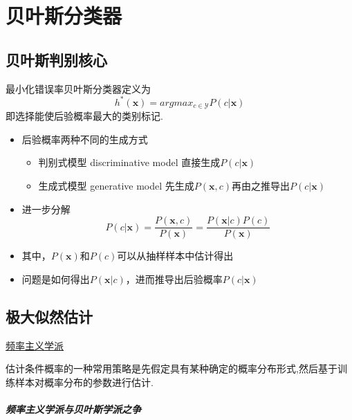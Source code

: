 \chapter{贝叶斯分类器}


\section{贝叶斯判别核心}

最小化错误率贝叶斯分类器定义为
\begin{equation}
h^\ast(\bm x)=argmax_{c\in \mathcal Y}P(c|\bm{x})
\end{equation}
即选择能使后验概率最大的类别标记.

\begin{itemize}
\item 后验概率两种不同的生成方式
    \begin{itemize}
    \item 判别式模型 discriminative model 直接生成$P(c|\bm{x})$
    \item 生成式模型 generative model 先生成$P(\bm{x}, c)$再由之推导出$P(c|\bm{x})$
    \end{itemize}
\item 进一步分解
    \begin{equation}
    P(c|\bm{x})=\frac{P(\bm{x}, c)}{P(\bm{x})}=\frac{P(\bm{x}|c)P(c)}{P(\bm{x})}
    \end{equation}
    \item 其中，$P(\bm{x})$和$P(c)$可以从抽样样本中估计得出
    \item 问题是如何得出$P(\bm{x}|c)$，进而推导出后验概率$P(c|\bm{x})$
\end{itemize}

\section{极大似然估计}
\underline{频率主义学派}

估计条件概率的一种常用策略是先假定具有某种确定的概率分布形式,然后基于训练样本对概率分布的参数进行估计.

\paragraph{频率主义学派与贝叶斯学派之争}

